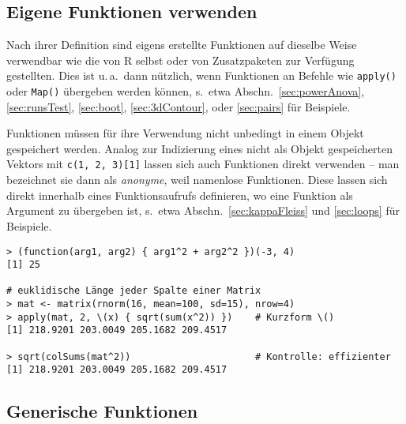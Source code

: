 \subsection{Eigene Funktionen verwenden}
\label{sec:functionUse}

Nach ihrer Definition sind eigens erstellte Funktionen auf dieselbe Weise verwendbar wie die von R selbst oder von Zusatzpaketen zur Verfügung gestellten. Dies ist u.\,a.\ dann nützlich, wenn Funktionen an Befehle wie \lstinline!apply()! oder \lstinline!Map()! übergeben werden können, s.\ etwa Abschn.\ \ref{sec:powerAnova}, \ref{sec:runsTest}, \ref{sec:boot}, \ref{sec:3dContour}, oder \ref{sec:pairs} für Beispiele.

Funktionen müssen für ihre Verwendung nicht unbedingt in einem Objekt gespeichert werden. Analog zur Indizierung eines nicht als Objekt gespeicherten Vektors mit \lstinline!c(1, 2, 3)[1]! lassen sich auch Funktionen direkt verwenden -- man bezeichnet sie dann als \emph{anonyme}, weil namenlose Funktionen. Diese lassen sich direkt innerhalb eines Funktionsaufrufs definieren, wo eine Funktion als Argument zu übergeben ist, s.\ etwa Abschn.\ \ref{sec:kappaFleiss} und \ref{sec:loops} für Beispiele.
\begin{lstlisting}
> (function(arg1, arg2) { arg1^2 + arg2^2 })(-3, 4)
[1] 25

# euklidische Länge jeder Spalte einer Matrix
> mat <- matrix(rnorm(16, mean=100, sd=15), nrow=4)
> apply(mat, 2, \(x) { sqrt(sum(x^2)) })    # Kurzform \()
[1] 218.9201 203.0049 205.1682 209.4517

> sqrt(colSums(mat^2))                      # Kontrolle: effizienter
[1] 218.9201 203.0049 205.1682 209.4517
\end{lstlisting}

\subsection{Generische Funktionen}
\label{sec:funcGeneric}

